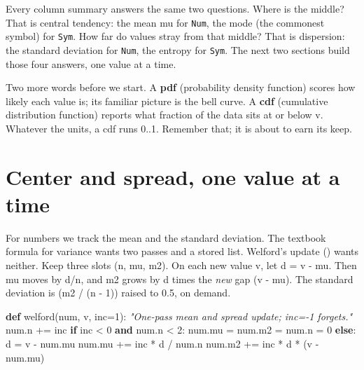 \documentclass[
  justified]{tufte-book}
\newenvironment{Shaded}{}{}
\newcommand{\CommentTok}[1]{\textcolor[rgb]{0.38,0.63,0.69}{\textit{#1}}}
\newcommand{\ControlFlowTok}[1]{\textcolor[rgb]{0.00,0.44,0.13}{\textbf{#1}}}
\newcommand{\DecValTok}[1]{\textcolor[rgb]{0.25,0.63,0.44}{#1}}
\newcommand{\KeywordTok}[1]{\textcolor[rgb]{0.00,0.44,0.13}{\textbf{#1}}}
\newcommand{\NormalTok}[1]{#1}
\newcommand{\OperatorTok}[1]{\textcolor[rgb]{0.40,0.40,0.40}{#1}}
\begin{document}
Every column summary answers the same two questions. Where is the
middle? That is central tendency: the mean mu for \texttt{Num}, the mode
(the commonest symbol) for \texttt{Sym}. How far do values stray from
that middle? That is dispersion: the standard deviation for
\texttt{Num}, the entropy for \texttt{Sym}. The next two sections build
those four answers, one value at a time.

Two more words before we start. A \textbf{pdf} (probability density
function) scores how likely each value is; its familiar picture is the
bell curve. A \textbf{cdf} (cumulative distribution function) reports
what fraction of the data sits at or below v. Whatever the units, a cdf
runs 0..1. Remember that; it is about to earn its keep.

\section{Center and spread, one value at a
time}\label{center-and-spread-one-value-at-a-time}

For numbers we track the mean and the standard deviation. The textbook
formula for variance wants two passes and a stored list. Welford's
update () wants neither. Keep
three slots (n, mu, m2). On each new value v, let d = v - mu. Then mu
moves by d/n, and m2 grows by d times the \emph{new} gap (v - mu). The
standard deviation is (m2 / (n - 1)) raised to 0.5, on demand.

\begin{Shaded}
\begin{Highlighting}[]
\KeywordTok{def}\NormalTok{ welford(num, v, inc}\OperatorTok{=}\DecValTok{1}\NormalTok{):}
  \CommentTok{"One{-}pass mean and spread update; inc={-}1 forgets."}
\NormalTok{  num.n }\OperatorTok{+=}\NormalTok{ inc}
  \ControlFlowTok{if}\NormalTok{ inc }\OperatorTok{\textless{}} \DecValTok{0} \KeywordTok{and}\NormalTok{ num.n }\OperatorTok{\textless{}} \DecValTok{2}\NormalTok{:}
\NormalTok{    num.mu }\OperatorTok{=}\NormalTok{ num.m2 }\OperatorTok{=}\NormalTok{ num.n }\OperatorTok{=} \DecValTok{0}
  \ControlFlowTok{else}\NormalTok{:}
\NormalTok{    d       }\OperatorTok{=}\NormalTok{ v }\OperatorTok{{-}}\NormalTok{ num.mu}
\NormalTok{    num.mu }\OperatorTok{+=}\NormalTok{ inc }\OperatorTok{*}\NormalTok{ d }\OperatorTok{/}\NormalTok{ num.n}
\NormalTok{    num.m2 }\OperatorTok{+=}\NormalTok{ inc }\OperatorTok{*}\NormalTok{ d }\OperatorTok{*}\NormalTok{ (v }\OperatorTok{{-}}\NormalTok{ num.mu)}
\end{Highlighting}
\end{Shaded}
\end{document}
